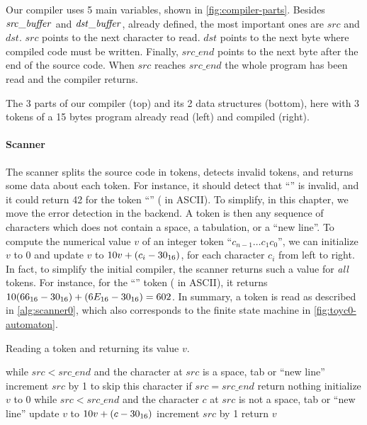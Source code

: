 Our compiler uses 5 main variables, shown in \cref{fig:compiler-parts}. Besides
$\it{src\_buffer}$ and $\it{dst\_buffer}$, already defined, the most
important ones are $src$ and $dst$. $src$ points to the next character to read.
$dst$ points to the next byte where compiled code must be written. Finally,
$src\_end$ points to the next byte after the end of the source code. When $src$
reaches $src\_end$ the whole program has been read and the compiler returns.

\begin{Figure}
  

  \caption{The 3 parts of our compiler (top) and its 2 data structures
  (bottom), here with 3 tokens of a 15 bytes program already read (left) and
  compiled (right).}\label{fig:compiler-parts}
\end{Figure}

\bigskip \paragraph*{Scanner} The scanner splits the source code in tokens,
detects invalid tokens, and returns some data about each token. For instance, it
should detect that ``'' is invalid, and it could return 42 for the
token ``'' ( in ASCII). To simplify, in this chapter,
we move the error detection in the backend. A token is then any sequence of
characters which does not contain a space, a tabulation, or a ``new line''. To
compute the numerical value $v$ of an integer token ``$c_{n-1}\ldots c_1c_0$'',
we can initialize $v$ to 0 and update $v$ to $10v+(c_i-30_{16})$, for each
character $c_i$ from left to right. In fact, to simplify the initial compiler,
the scanner returns such a value for {\em all} tokens. For instance, for the
``'' token ( in ASCII), it returns
$10(66_{16}-30_{16})+(6E_{16}-30_{16})=602$. In summary, a token is read
as described in \cref{alg:scanner0}, which also corresponds to the finite state
machine in \cref{fig:toyc0-automaton}.

\begin{Algorithm}
\caption{Reading a token and returning its value $v$.}\label{alg:scanner0}
\begin{algorithmic}[1]
\Begin while $src<src\_end$ and the character at $src$ is a space, tab or ``new
line''
  \State increment $src$ by 1 to skip this character
\End
\State if $src=src\_end$ return nothing
\State initialize $v$ to 0
\Begin while $src<src\_end$ and the character $c$ at $src$ is not a space, tab
or ``new line''
  \State update $v$ to $10v+(c-30_{16})$
  \State increment $src$ by 1
\End
\State return $v$
\end{algorithmic}
\end{Algorithm}

